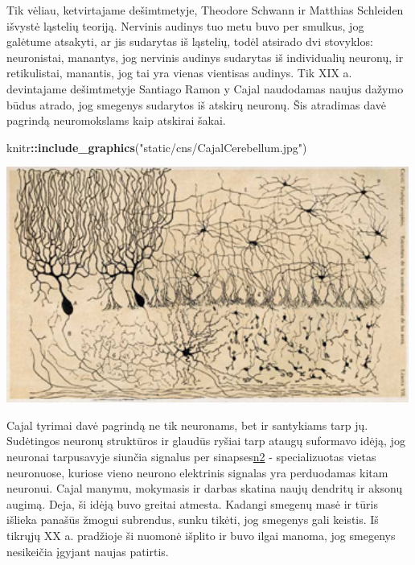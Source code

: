 \documentclass[]{book}
\newenvironment{Shaded}{\begin{snugshade}}{\end{snugshade}}
\newcommand{\KeywordTok}[1]{\textcolor[rgb]{0.13,0.29,0.53}{\textbf{#1}}}
\newcommand{\NormalTok}[1]{#1}
\newcommand{\OperatorTok}[1]{\textcolor[rgb]{0.81,0.36,0.00}{\textbf{#1}}}
\newcommand{\StringTok}[1]{\textcolor[rgb]{0.31,0.60,0.02}{#1}}
\begin{document}
Tik vėliau, ketvirtajame dešimtmetyje, Theodore Schwann ir Matthias Schleiden išvystė ląstelių teoriją. Nervinis audinys tuo metu buvo per smulkus, jog galėtume atsakyti, ar jis sudarytas iš ląstelių, todėl atsirado dvi stovyklos: neuronistai, manantys, jog nervinis audinys sudarytas iš individualių neuronų, ir retikulistai, manantis, jog tai yra vienas vientisas audinys. Tik XIX a. devintajame dešimtmetyje Santiago Ramon y Cajal naudodamas naujus dažymo būdus atrado, jog smegenys sudarytos iš atskirų neuronų. Šis atradimas davė pagrindą neuromokslams kaip atskirai šakai.

\begin{Shaded}
\begin{Highlighting}[]
\NormalTok{knitr}\OperatorTok{::}\KeywordTok{include_graphics}\NormalTok{(}\StringTok{"static/cns/CajalCerebellum.jpg"}\NormalTok{)}
\end{Highlighting}
\end{Shaded}

\includegraphics[width=500px]{static/cns/CajalCerebellum}

Cajal tyrimai davė pagrindą ne tik neuronams, bet ir santykiams tarp jų. Sudėtingos neuronų struktūros ir glaudūs ryšiai tarp ataugų suformavo idėją, jog neuronai tarpusavyje siunčia signalus per sinapses\href{Terminas\%20sinapsė\%20atsiras\%20tik\%20vėliau,\%201897\%20m.}{n2} - specializuotas vietas neuronuose, kuriose vieno neurono elektrinis signalas yra perduodamas kitam neuronui. Cajal manymu, mokymasis ir darbas skatina naujų dendritų ir aksonų augimą. Deja, ši idėją buvo greitai atmesta. Kadangi smegenų masė ir tūris išlieka panašūs žmogui subrendus, sunku tikėti, jog smegenys gali keistis. Iš tikrųjų XX a. pradžioje ši nuomonė išplito ir buvo ilgai manoma, jog smegenys nesikeičia įgyjant naujas patirtis.
\end{document}
